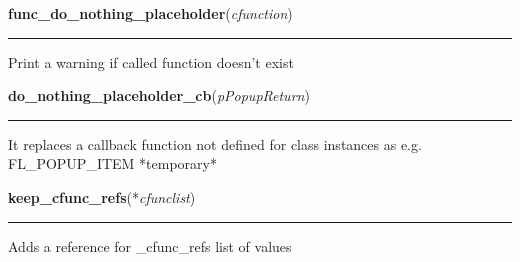     \label{xformslib:library:func_do_nothing_placeholder}

    \vspace{0.5ex}

\hspace{.8\funcindent}\begin{boxedminipage}{\funcwidth}

    \raggedright \textbf{func\_do\_nothing\_placeholder}(\textit{cfunction})

    \vspace{-1.5ex}

    \rule{\textwidth}{0.5\fboxrule}
\setlength{\parskip}{2ex}
    Print a warning if called function doesn't exist

\setlength{\parskip}{1ex}
    \end{boxedminipage}

    \label{xformslib:library:do_nothing_placeholder_cb}

    \vspace{0.5ex}

\hspace{.8\funcindent}\begin{boxedminipage}{\funcwidth}

    \raggedright \textbf{do\_nothing\_placeholder\_cb}(\textit{pPopupReturn})

    \vspace{-1.5ex}

    \rule{\textwidth}{0.5\fboxrule}
\setlength{\parskip}{2ex}
    It replaces a callback function not defined for class instances as e.g.
    FL\_POPUP\_ITEM            *temporary*

\setlength{\parskip}{1ex}
    \end{boxedminipage}

    \label{xformslib:library:keep_cfunc_refs}

    \vspace{0.5ex}

\hspace{.8\funcindent}\begin{boxedminipage}{\funcwidth}

    \raggedright \textbf{keep\_cfunc\_refs}(*\textit{cfunclist})

    \vspace{-1.5ex}

    \rule{\textwidth}{0.5\fboxrule}
\setlength{\parskip}{2ex}
    Adds a reference for \_cfunc\_refs list of values

\setlength{\parskip}{1ex}
    \end{boxedminipage}


